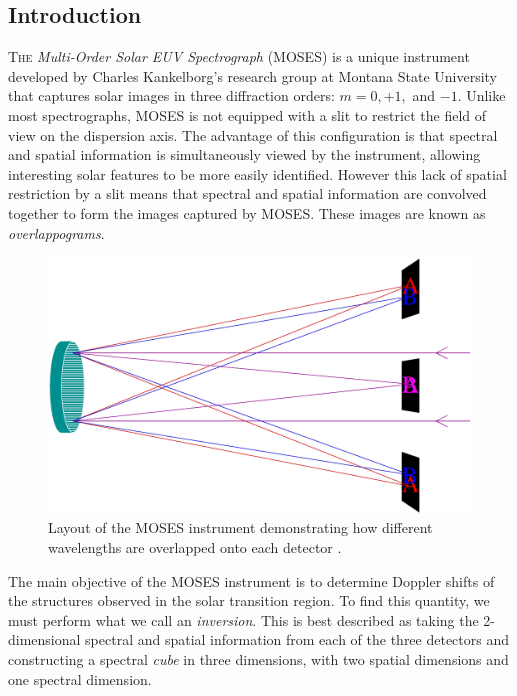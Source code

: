 \documentclass[twoside]{article}
\begin{document}
\begin{multicols}{2}
\section{Introduction}
\lettrine{T}{he} \textit{Multi-Order Solar EUV Spectrograph} (MOSES) is a unique instrument developed by Charles Kankelborg's research group at Montana State University that captures solar images in three diffraction orders: $m=0,+1,$ and $-1$. Unlike most spectrographs, MOSES is not equipped with a slit to restrict the field of view on the dispersion axis. The advantage of this configuration is that spectral and spatial information is simultaneously viewed by the instrument, allowing interesting solar features to be more easily identified. However this lack of spatial restriction by a slit means that spectral and spatial information are convolved together to form the images captured by MOSES. These images are known as \textit{overlappograms}. \par
\begin{figure}[H]
	\includegraphics[width=\linewidth]{images/instrument.eps}
	\caption{Layout of the MOSES instrument demonstrating how different wavelengths are overlapped onto each detector \cite{moses}.}
\end{figure}
The main objective of the MOSES instrument is to determine Doppler shifts of the structures observed in the solar transition region. To find this quantity, we must perform what we call an \textit{inversion}. This is best described as taking the 2-dimensional spectral and spatial information from each of the three detectors and constructing a spectral \textit{cube} in three dimensions, with two spatial dimensions and one spectral dimension.
\begin{figure}[H]

\end{figure}
\end{multicols}
\end{document}
